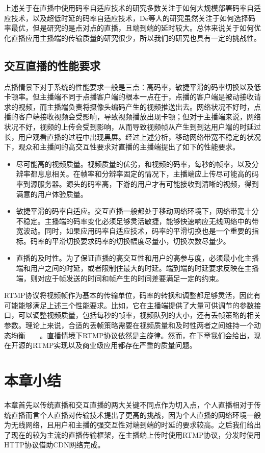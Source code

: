 上述关于在直播中使用码率自适应技术的研究多数关注于如何大规模部署码率自适应技术，以及超低时延的码率自适应技术，De等人的研究虽然关注于如何选择码率最优，但是研究的是点对点的直播，且端到端的延时较大。总体来说关于如何优化直播应用主播端的传输质量的研究很少，所以我们的研究也具有一定的挑战性。

\subsection{交互直播的性能要求}
点播情景下对于系统的性能要求一般是三点：高码率，敏捷平滑的码率切换以及低卡顿率。但主播端不同于点播客户端的根本一点在于，点播的客户端是被动接收请求的视频，而主播端负责将摄像头编码产生的视频推送出去。网络状况不好时，点播的客户端接收视频会受影响，导致视频播放出现卡顿；但对于主播端来说，网络状况不好，视频的上传会受到影响，从而导致视频帧从产生到到达用户端的时延过长，用户观看直播的过程中出现黑屏。经过上述分析，移动网络带宽不稳定的状况下，观众和主播间的高交互性要求对直播的主播端提出了如下的性能要求。
\begin{itemize}
  \item 尽可能高的视频质量。视频质量的优劣，和视频的码率，每秒的帧率，以及分辨率都息息相关。在帧率和分辨率固定的情况下，主播端应上传尽可能高的码率到源服务器。源头的码率高，下游的用户才有可能接收到清晰的视频，得到满意的用户体验质量。
  \item 敏捷平滑的码率自适应。交互直播一般都处于移动网络环境下，网络带宽十分不稳定。主播端的码率变化必须足够灵活敏捷，能够快速响应无线网络中的带宽波动。同时，如果应用码率自适应技术，码率的平滑切换也是一个重要的指标。码率的平滑切换要求码率的切换幅度尽量小，切换次数尽量少。
  \item 直播的及时性。为了保证直播的高交互性和用户的高参与度，必须最小化主播端和用户之间的时延，或者限制住最大的时延。端到端的时延要求反映在主播端，则对应于帧发送的时间和帧产生的时间差要满足一定的约束。
\end{itemize}

RTMP协议将视频帧作为基本的传输单位，码率的转换和调整都足够灵活，因此有可能能够满足上述三个性能要求。比如，它在主播端提供了大量可供调节的参数接口，可以调整视频质量，包括每秒的帧率，视频队列的大小，还有丢帧策略的相关参数。理论上来说，合适的丢帧策略需要在视频质量和及时性两者之间维持一个动态均衡~\cite{krasic2003quality}~\cite{singh2004dynamic}~\cite{huang2003adaptive}~\cite{fouladi2018salsify}。直播情境下RTMP协议依然是主旋律。然而，在下章我们会给出，现在开源的RTMP实现以及商业级应用都存在严重的质量问题。

\section{本章小结}
本章首先以传统直播和交互直播的两大关键不同点作为切入点，个人直播相对于传统直播而言个人直播对传输技术提出了更高的挑战，因为个人直播的网络环境一般为无线网络，且用户和主播的强交互性对端到端的时延的要求较高。之后我们给出了现在的较为主流的直播传输框架，在主播端上传时使用RTMP协议，分发时使用HTTP协议借助CDN网络完成。

